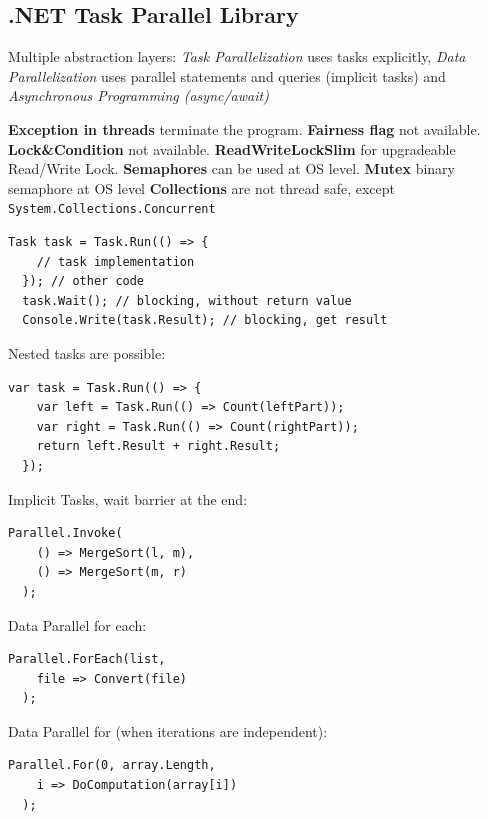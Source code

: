 \subsection{.NET Task Parallel Library}
Multiple abstraction layers: \textit{Task Parallelization} uses tasks explicitly, \textit{Data Parallelization} uses parallel statements and queries (implicit tasks) and \textit{Asynchronous Programming (async/await)}

\textbf{Exception in threads} terminate the program.
\textbf{Fairness flag} not available.
\textbf{Lock\&Condition} not available.
\textbf{ReadWriteLockSlim} for upgradeable Read/Write Lock.
\textbf{Semaphores} can be used at OS level.
\textbf{Mutex} binary semaphore at OS level
\textbf{Collections} are not thread safe, except \texttt{System.Collections.Concurrent}

\begin{lstlisting}[style=java]
  Task task = Task.Run(() => {
    // task implementation
  }); // other code
  task.Wait(); // blocking, without return value
  Console.Write(task.Result); // blocking, get result
\end{lstlisting}

Nested tasks are possible:
\begin{lstlisting}[style=java]
  var task = Task.Run(() => {
    var left = Task.Run(() => Count(leftPart));
    var right = Task.Run(() => Count(rightPart));
    return left.Result + right.Result;
  });
\end{lstlisting}

\begin{minipage}[t]{0.5\linewidth}
  Implicit Tasks, wait barrier at the end: 
  \begin{lstlisting}[style=java]
  Parallel.Invoke(
    () => MergeSort(l, m),
    () => MergeSort(m, r)
  );
  \end{lstlisting}
\end{minipage}
\begin{minipage}[t]{0.5\linewidth}
  Data Parallel for each:
  \begin{lstlisting}[style=java]
  Parallel.ForEach(list, 
    file => Convert(file)
  );
  \end{lstlisting}
\end{minipage}

Data Parallel for (when iterations are independent):
\begin{lstlisting}[style=java]
  Parallel.For(0, array.Length, 
    i => DoComputation(array[i])
  );
\end{lstlisting}

